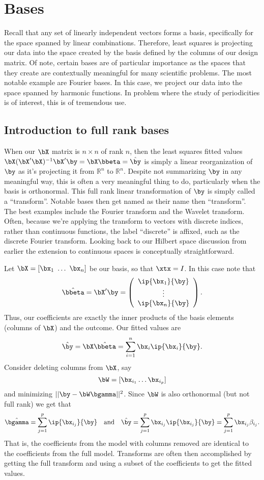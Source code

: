 \section{Bases}


Recall that any set of linearly independent vectors forms a basis,
specifically for the space spanned by linear combinations. Therefore,
least squares is projecting our data into the space created by
the basis defined by the columns of our design matrix. Of note,
certain bases are of particular importance as the spaces that
they create are contextually meaningful for many scientific
problems. The most notable example are Fourier bases. In this
case, we project our data into the space spanned by harmonic
functions. In problem where the study of periodicities is 
of interest, this is of tremendous use.

\subsection{Introduction to full rank bases}


When our $\bX$ matrix is $n\times n$ of rank $n$, then the least squares
fitted values $\bX (\bX' \bX)^{-1} \bX' \by = \bX \bbeta = \hat \by$ is simply a linear reorganization
of $\by$ as it's projecting it from $\mathbb{R}^n$ to $\mathbb{R}^n$. 
Despite not summarizing $\by$ in any meaningful way, this is often
a very meaningful thing to do, particularly when the basis is orthonormal.
This full rank linear transformation of $\by$ is simply called a 
``transform''. Notable bases then get named as their name then ``transform''. 
The best examples include the Fourier transform and the Wavelet transform.
Often, because we're applying the transform to vectors with discrete
indices, rather than continuous functions, the label ``discrete'' is
affixed, such as the discrete Fourier transform. Looking back to
our Hilbert space discussion from earlier the extension to continuous
spaces is conceptually straightforward. 

Let $\bX = [\bx_1 ~ \ldots ~ \bx_n]$ be our basis, so that 
$\xtx = I$. In this case note that 
$$
\hat \bbeta
= \bX' \by 
= 
\left(
\begin{array}{c}
 \ip{\bx_1}{\by} \\
 \vdots \\
 \ip{\bx_n}{\by}
\end{array}
\right).
$$
Thus, our coefficients are exactly the inner products of the basis elements (columns of $\bX$) and the outcome. Our fitted values are
$$
\hat \by = \bX \hat \bbeta = \sum_{i=1}^n \bx_i \ip{\bx_i}{\by}.
$$
Consider deleting columns from $\bX$, say 
$$
\bW = [\bx_{i_1} \ldots \bx_{i_p}]
$$
and minimizing $||\by - \bW \bgamma||^2$. Since $\bW$ is also orthonormal (but not full rank) we get that 
$$
\hat \bgamma = \sum_{j=1}^p \ip{\bx_{i_j}}{\by} ~~~
\mbox{and} ~~~
\hat \by = \sum_{j=1}^p \bx_{i_j} \ip{\bx_{i_j}}{\by}
=  \sum_{j=1}^p \bx_{i_j} \beta_{i_j}.
$$
That is, the coefficients from the model with columns removed are identical
to the coefficients from the full model. Transforms are often then
accomplished by getting the full transform and using a subset of the 
coefficients to get the fitted values. 


